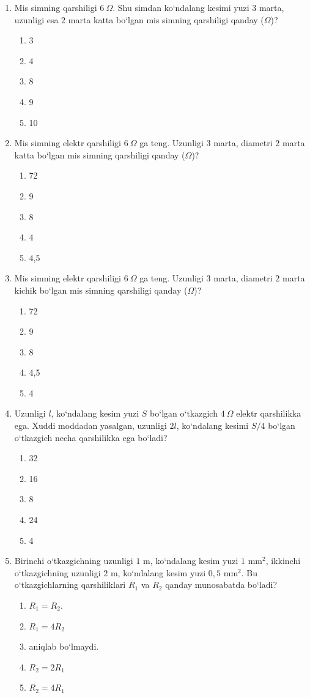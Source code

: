 \begin{enumerate}
\item Mis simning qarshiligi $6~\Omega$. Shu simdan ko‘ndalang kesimi yuzi $3$ marta, uzunligi esa $2$ marta katta bo‘lgan mis simning qarshiligi qanday ($\Omega$)?
\begin{enumerate}[label=\Alph*)]
\item 3
\item 4
\item 8
\item 9
\item 10
\end{enumerate}

\item Mis simning elektr qarshiligi $6~\Omega$ ga teng. Uzunligi $3$ marta, diametri $2$ marta katta bo‘lgan mis simning qarshiligi qanday ($\Omega$)?
\begin{enumerate}[label=\Alph*)]
\item 72
\item 9
\item 8
\item 4
\item 4,5
\end{enumerate}

\item Mis simning elektr qarshiligi $6~\Omega$ ga teng. Uzunligi $3$ marta, diametri $2$ marta kichik bo‘lgan mis simning qarshiligi qanday ($\Omega$)?
\begin{enumerate}[label=\Alph*)]
\item 72
\item 9
\item 8
\item 4,5
\item 4
\end{enumerate}

\item Uzunligi $l$, ko‘ndalang kesim yuzi $S$ bo‘lgan o‘tkazgich $4~\Omega$ elektr qarshilikka ega. Xuddi moddadan yasalgan, uzunligi $2l$, ko‘ndalang kesimi $S/4$ bo‘lgan o‘tkazgich necha qarshilikka ega bo‘ladi?
\begin{enumerate}[label=\Alph*)]
\item 32
\item 16
\item 8
\item 24
\item 4
\end{enumerate}

\item Birinchi o‘tkazgichning uzunligi $1$ m, ko‘ndalang kesim yuzi $1$ mm$^2$, ikkinchi o‘tkazgichning uzunligi $2$ m, ko‘ndalang kesim yuzi $0,5$ mm$^2$. Bu o‘tkazgichlarning qarshiliklari $R_1$ va $R_2$ qanday munosabatda bo‘ladi?
\begin{enumerate}[label=\Alph*)]
\item $R_1=R_2$.
\item $R_1=4R_2$
\item aniqlab bo‘lmaydi.
\item $R_2=2R_1$
\item $R_2=4R_1$
\end{enumerate}


\end{enumerate}
